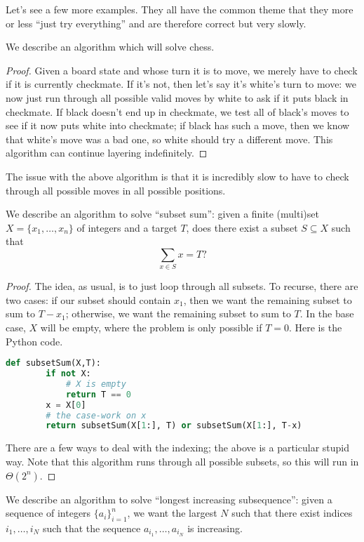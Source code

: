 \documentclass{article}
\begin{document}
Let's see a few more examples. They all have the common theme that they more or less ``just try everything'' and are therefore correct but very slowly.
\begin{exe}
	We describe an algorithm which will solve chess.
\end{exe}
\begin{proof}
	Given a board state and whose turn it is to move, we merely have to check if it is currently checkmate. If it's not, then let's say it's white's turn to move: we now just run through all possible valid moves by white to ask if it puts black in checkmate. If black doesn't end up in checkmate, we test all of black's moves to see if it now puts white into checkmate; if black has such a move, then we know that white's move was a bad one, so white should try a different move. This algorithm can continue layering indefinitely.
\end{proof}
\begin{remark}
	The issue with the above algorithm is that it is incredibly slow to have to check through all possible moves in all possible positions.
\end{remark}
\begin{exe}
	We describe an algorithm to solve ``subset sum'': given a finite (multi)set $X=\{x_1,\ldots,x_n\}$ of integers and a target $T$, does there exist a subset $S\subseteq X$ such that
	\[\sum_{x\in S}x=T?\]
\end{exe}
\begin{proof}
	The idea, as usual, is to just loop through all subsets. To recurse, there are two cases: if our subset should contain $x_1$, then we want the remaining subset to sum to $T-x_1$; otherwise, we want the remaining subset to sum to $T$. In the base case, $X$ will be empty, where the problem is only possible if $T=0$. Here is the Python code.
	\begin{lstlisting}[language=Python]
	def subsetSum(X,T):
		if not X:
			# X is empty
			return T == 0
		x = X[0]
		# the case-work on x
		return subsetSum(X[1:], T) or subsetSum(X[1:], T-x)
	\end{lstlisting}
	There are a few ways to deal with the indexing; the above is a particular stupid way. Note that this algorithm runs through all possible subsets, so this will run in $\Theta\left(2^n\right)$.
\end{proof}
\begin{exe}
	We describe an algorithm to solve ``longest increasing subsequence'': given a sequence of integers $\{a_i\}_{i=1}^n$, we want the largest $N$ such that there exist indices $i_1,\ldots,i_N$ such that the sequence $a_{i_1},\ldots,a_{i_N}$ is increasing.
\end{exe}
\end{document}
